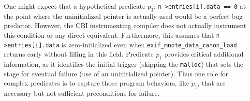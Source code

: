 One might expect that a hypothetical predicate $p_3$: \texttt{n->entries[i].data == 0} at the point where the uninitialized pointer is actually used would be a perfect bug predictor.  However, the CBI instrumenting compiler does not actually instrument this condition or any direct equivalent.  Furthermore, this assumes that \texttt{n->entries[i].data} is zero-initialized even when \texttt{exif\_mnote\_data\_canon\_load} returns early without filling in this field.  Predicate $p_1$ provides critical additional information, as it identifies the initial trigger (skipping the \texttt{malloc}) that sets the stage for eventual failure (use of an uninitialized pointer).  Thus one role for complex predicates is to capture those program behaviors, like $p_1$, that are necessary but not sufficient preconditions for failure.

